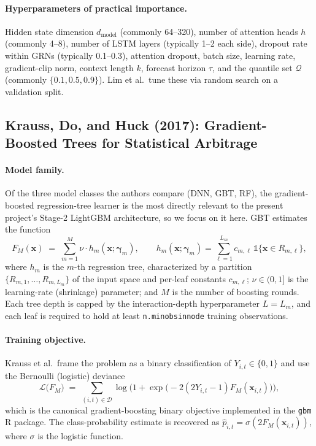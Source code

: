 \documentclass[11pt]{article}
\begin{document}
\paragraph{Hyperparameters of practical importance.}  Hidden state dimension $d_{\text{model}}$ (commonly 64--320), number of attention heads $h$ (commonly 4--8), number of LSTM layers (typically 1--2 each side), dropout rate within GRNs (typically 0.1--0.3), attention dropout, batch size, learning rate, gradient-clip norm, context length $k$, forecast horizon $\tau$, and the quantile set $\mathcal{Q}$ (commonly $\{0.1, 0.5, 0.9\}$).  Lim et al.\ tune these via random search on a validation split.

\subsection{Krauss, Do, and Huck (2017): Gradient-Boosted Trees for Statistical Arbitrage}

\paragraph{Model family.}  Of the three model classes the authors compare (DNN, GBT, RF), the gradient-boosted regression-tree learner is the most directly relevant to the present project's Stage-2 LightGBM architecture, so we focus on it here.  GBT estimates the function
\begin{equation}
    F_M(\bm{x}) \;=\; \sum_{m=1}^{M} \nu \cdot h_m(\bm{x}; \bm{\gamma}_m), \qquad h_m(\bm{x}; \bm{\gamma}_m) = \sum_{\ell=1}^{L_m} c_{m,\ell} \,\mathbb{1}\{\bm{x} \in R_{m,\ell}\},
\end{equation}
where $h_m$ is the $m$-th regression tree, characterized by a partition $\{R_{m,1},\dots,R_{m,L_m}\}$ of the input space and per-leaf constants $c_{m,\ell}$; $\nu \in (0,1]$ is the learning-rate (shrinkage) parameter; and $M$ is the number of boosting rounds.  Each tree depth is capped by the interaction-depth hyperparameter $L = L_m$, and each leaf is required to hold at least \texttt{n.minobsinnode} training observations.

\paragraph{Training objective.}  Krauss et al.\ frame the problem as a binary classification of $Y_{i,t} \in \{0,1\}$ and use the Bernoulli (logistic) deviance
\begin{equation}
    \mathcal{L}\bigl( F_M \bigr) \;=\; \sum_{(i,t) \in \mathcal{D}} \log\!\bigl( 1 + \exp\!\bigl( -2 (2 Y_{i,t} - 1) F_M(\bm{x}_{i,t}) \bigr) \bigr),
\end{equation}
which is the canonical gradient-boosting binary objective implemented in the \texttt{gbm} R package.  The class-probability estimate is recovered as $\hat{p}_{i,t} = \sigma(2 F_M(\bm{x}_{i,t}))$, where $\sigma$ is the logistic function.
\end{document}
